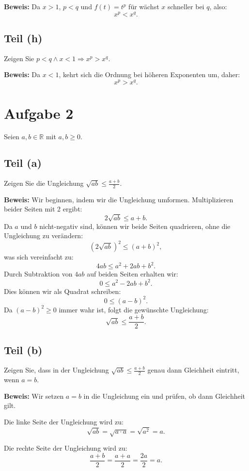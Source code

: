 \documentclass[11pt]{article}
\begin{document}
\textbf{Beweis:} Da \( x > 1 \), \( p < q \) und \(f(t)=t^p\) für wächst \( x \) schneller bei \( q \), also:
\[
x^p < x^q.
\]

\subsection*{Teil (h)}
Zeigen Sie \( p < q \land x < 1 \Rightarrow x^p > x^q \).

\textbf{Beweis:} Da \( x < 1 \), kehrt sich die Ordnung bei höheren Exponenten um, daher:
\[
x^p > x^q.
\]

\section*{Aufgabe 2}

Seien \( a, b \in \mathbb{R} \) mit \( a, b \geq 0 \).

\subsection*{Teil (a)}
Zeigen Sie die Ungleichung \( \sqrt{ab} \leq \frac{a + b}{2} \).

\textbf{Beweis:} Wir beginnen, indem wir die Ungleichung umformen. Multiplizieren beider Seiten mit 2 ergibt:
\[
2\sqrt{ab} \leq a + b.
\]
Da \( a \) und \( b \) nicht-negativ sind, können wir beide Seiten quadrieren, ohne die Ungleichung zu verändern:
\[
(2\sqrt{ab})^2 \leq (a + b)^2,
\]
was sich vereinfacht zu:
\[
4ab \leq a^2 + 2ab + b^2.
\]
Durch Subtraktion von \( 4ab \) auf beiden Seiten erhalten wir:
\[
0 \leq a^2 - 2ab + b^2.
\]
Dies können wir als Quadrat schreiben:
\[
0 \leq (a - b)^2.
\]
Da \( (a - b)^2 \geq 0 \) immer wahr ist, folgt die gewünschte Ungleichung:
\[
\sqrt{ab} \leq \frac{a + b}{2}.
\]

\subsection*{Teil (b)}
Zeigen Sie, dass in der Ungleichung \( \sqrt{ab} \leq \frac{a + b}{2} \) genau dann Gleichheit eintritt, wenn \( a = b \).

\textbf{Beweis:} Wir setzen \( a = b \) in die Ungleichung ein und prüfen, ob dann Gleichheit gilt.

Die linke Seite der Ungleichung wird zu:
\[
\sqrt{ab} = \sqrt{a \cdot a} = \sqrt{a^2} = a.
\]

Die rechte Seite der Ungleichung wird zu:
\[
\frac{a + b}{2} = \frac{a + a}{2} = \frac{2a}{2} = a.
\]
\end{document}

